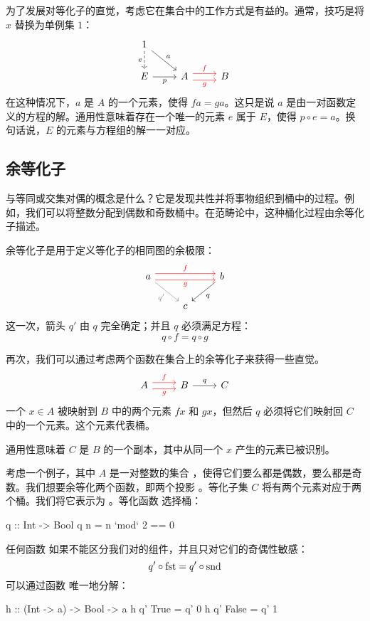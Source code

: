 \documentclass[DaoFP]{subfiles}
\begin{document}
为了发展对等化子的直觉，考虑它在集合中的工作方式是有益的。通常，技巧是将 $x$ 替换为单例集 $1$：
\[
\begin{tikzcd}
1
\arrow[d, dashed, "e"']
\arrow[dr, "a"]
\\
E
\arrow[r, "p"']
&
A \arrow[r, red, shift left=0.75ex, "f"]
  \arrow[r, red, shift right=0.75ex, "g"']
&
B
\end{tikzcd}
\]
在这种情况下，$a$ 是 $A$ 的一个元素，使得 $f a = g a$。这只是说 $a$ 是由一对函数定义的方程的解。通用性意味着存在一个唯一的元素 $e$ 属于 $E$，使得 $p \circ e = a$。换句话说，$E$ 的元素与方程组的解一一对应。

\subsection{余等化子}

与等同或交集对偶的概念是什么？它是发现共性并将事物组织到桶中的过程。例如，我们可以将整数分配到偶数和奇数桶中。在范畴论中，这种桶化过程由余等化子描述。

余等化子是用于定义等化子的相同图的余极限：
\[
\begin{tikzcd}
a 
\arrow[rr, red, shift left=.75ex, "f"]
\arrow[rr, red, shift right=.75ex, "g"']
\arrow[rd, gray, "q'"']
&&
b
\arrow[ld, "q"]
\\
& c
\end{tikzcd}
\]
这一次，箭头 $q'$ 由 $q$ 完全确定；并且 $q$ 必须满足方程：
\[ q \circ f = q \circ g \]

再次，我们可以通过考虑两个函数在集合上的余等化子来获得一些直觉。
\[
\begin{tikzcd}
A
\arrow[r, red, shift left=.75ex, "f"]
\arrow[r, red, shift right=.75ex, "g"']
&
B
\arrow[r, "q"]
& C
\end{tikzcd}
\]
一个 $x \in A$ 被映射到 $B$ 中的两个元素 $f x$ 和 $g x$，但然后 $q$ 必须将它们映射回 $C$ 中的一个元素。这个元素代表桶。

通用性意味着 $C$ 是 $B$ 的一个副本，其中从同一个 $x$ 产生的元素已被识别。

考虑一个例子，其中 $A$ 是一对整数的集合 ，使得它们要么都是偶数，要么都是奇数。我们想要余等化两个函数，即两个投影 。等化子集 $C$ 将有两个元素对应于两个桶。我们将它表示为 。等化函数  选择桶：
\begin{haskell}
q :: Int -> Bool
q n = n `mod` 2 == 0 
\end{haskell}
任何函数  如果不能区分我们对的组件，并且只对它们的奇偶性敏感：
\[ q' \circ \mathop{\text{fst}} = q' \circ \mathop{\text{snd}} \]
可以通过函数  唯一地分解：
\begin{haskell}
h :: (Int -> a) -> Bool -> a
h q' True  = q' 0
h q' False = q' 1
\end{haskell}
\end{document}

